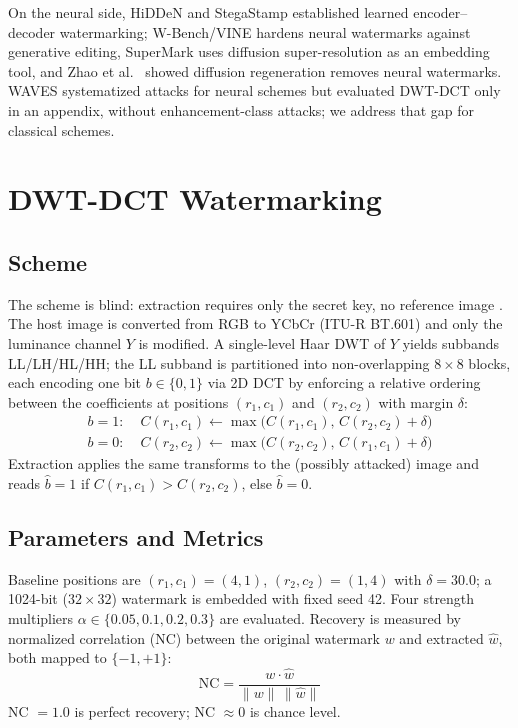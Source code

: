 \documentclass[conference]{IEEEtran}
\begin{document}
On the neural side, HiDDeN \cite{hidden2018} and StegaStamp
\cite{stegastamp2020} established learned encoder--decoder watermarking;
W-Bench/VINE \cite{wbench2024} hardens neural watermarks against
generative editing, SuperMark \cite{supermark2024} uses diffusion
super-resolution as an embedding tool, and Zhao et al.~\cite{zhao2023}
showed diffusion regeneration removes neural watermarks. WAVES
\cite{waves2024} systematized attacks for neural schemes but evaluated
DWT-DCT only in an appendix, without enhancement-class attacks; we
address that gap for classical schemes.

\section{DWT-DCT Watermarking}
\label{sec:background}

\subsection{Scheme}
The scheme is blind: extraction requires only the secret key, no
reference image \cite{cox2007}. The host image is converted from RGB to
YCbCr (ITU-R BT.601) and only the luminance channel $Y$ is modified. A
single-level Haar DWT of $Y$ yields subbands LL/LH/HL/HH; the LL
subband is partitioned into non-overlapping $8\times8$ blocks, each
encoding one bit $b \in \{0,1\}$ via 2D DCT by enforcing a relative
ordering between the coefficients at positions $(r_1,c_1)$ and
$(r_2,c_2)$ with margin $\delta$:
\begin{align}
b=1:\; & C(r_1,c_1) \leftarrow \max\!\big(C(r_1,c_1),\, C(r_2,c_2)+\delta\big) \\
b=0:\; & C(r_2,c_2) \leftarrow \max\!\big(C(r_2,c_2),\, C(r_1,c_1)+\delta\big)
\end{align}
Extraction applies the same transforms to the (possibly attacked)
image and reads $\hat{b} = 1$ if $C(r_1,c_1) > C(r_2,c_2)$, else
$\hat{b} = 0$.

\subsection{Parameters and Metrics}
Baseline positions are $(r_1,c_1)=(4,1)$, $(r_2,c_2)=(1,4)$ with
$\delta=30.0$; a 1024-bit ($32\times32$) watermark is embedded with
fixed seed 42.
Four strength multipliers $\alpha \in \{0.05, 0.1, 0.2, 0.3\}$ are
evaluated. Recovery is measured by normalized correlation (NC) between
the original watermark $w$ and extracted $\hat{w}$, both mapped to
$\{-1,+1\}$:
\begin{equation}
\mathrm{NC} = \frac{w \cdot \hat{w}}{\lVert w \rVert\, \lVert \hat{w} \rVert}
\end{equation}
NC $= 1.0$ is perfect recovery; NC $\approx 0$ is chance level.
\end{document}
